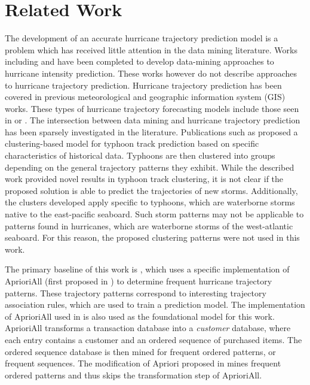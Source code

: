 \documentclass[12pt,conference]{IEEEtran}
\begin{document}
\section{Related Work}

The development of an accurate hurricane trajectory prediction model is a problem which has received little attention in the data mining literature. Works including \cite{hurricane-intensity-1} and \cite{hurricane-intensity-2} have been completed to develop data-mining approaches to hurricane intensity prediction. These works however do not describe approaches to hurricane trajectory prediction. Hurricane trajectory prediction has been covered in previous meteorological and geographic information system (GIS) works. These types of hurricane trajectory forecasting models include those seen in \cite{hurricane-forecasting-1} or \cite{hurricane-forecasting-2}. The intersection between data mining and hurricane trajectory prediction has been sparsely investigated in the literature. Publications such as \cite{typhoon-clustering} proposed a clustering-based model for typhoon track prediction based on specific characteristics of historical data. Typhoons are then clustered into groups depending on the general trajectory patterns they exhibit. While the described work provided novel results in typhoon track clustering, it is not clear if the proposed solution is able to predict the trajectories of new storms. Additionally, the clusters developed apply specific to typhoons, which are waterborne storms native to the east-pacific seaboard. Such storm patterns may not be applicable to patterns found in hurricanes, which are waterborne storms of the west-atlantic seaboard. For this reason, the proposed clustering patterns were not used in this work.

The primary baseline of this work is \cite{major-hurricane-model}, which uses a specific implementation of AprioriAll (first proposed in \cite{AprioriAll-original}) to determine frequent hurricane trajectory patterns. These trajectory patterns correspond to interesting trajectory association rules, which are used to train a prediction model. The implementation of AprioriAll used in \cite{major-hurricane-model} is also used as the foundational model for this work. AprioriAll transforms a transaction database into a \textit{customer} database, where each entry contains a customer and an ordered sequence of purchased items. The ordered sequence database is then mined for frequent ordered patterns, or frequent sequences. The modification of Apriori proposed in \cite{major-hurricane-model} mines frequent ordered patterns and thus skips the transformation step of AprioriAll. 
\end{document}
